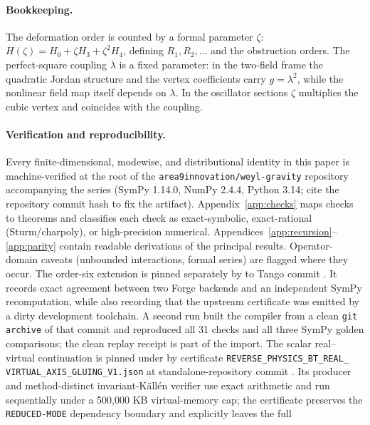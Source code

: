 \documentclass[11pt]{article}
\theoremstyle{definition}
\theoremstyle{remark}
\begin{document}
\paragraph{Bookkeeping.}
The deformation order is counted by a formal parameter $\zeta$:
$H(\zeta)=H_0+\zeta H_3+\zeta^2H_4$, defining $R_1,R_2,\dots$ and the
obstruction orders.  The perfect-square coupling $\lambda$ is a fixed
parameter: in the two-field frame the quadratic Jordan structure and
the vertex coefficients carry $g=\lambda^2$, while the nonlinear field
map itself depends on $\lambda$.  In the oscillator sections $\zeta$
multiplies the cubic vertex and coincides with the coupling.

\paragraph{Verification and reproducibility.}
Every finite-dimensional, modewise, and distributional identity in this
paper is machine-verified at the root of the
\texttt{area9innovation/weyl-gravity} repository accompanying the
series (SymPy 1.14.0, NumPy 2.4.4, Python 3.14; cite the repository
commit hash to fix the artifact).  Appendix~\ref{app:checks} maps
checks to theorems and classifies each check as exact-symbolic,
exact-rational (Sturm/charpoly), or high-precision numerical.
Appendices~\ref{app:recursion}--\ref{app:parity} contain readable
derivations of the principal results.  Operator-domain caveats
(unbounded interactions, formal series) are flagged where they occur.
The order-six extension is pinned separately by
to Tango commit
.  It records exact agreement
between two Forge backends and an independent SymPy recomputation, while also
recording that the upstream certificate was emitted by a dirty development
toolchain.  A second run built the compiler from a clean \texttt{git archive}
of that commit and reproduced all 31 checks and all three SymPy golden
comparisons; the clean replay receipt is part of the import.
The scalar real--virtual continuation is pinned under
 by certificate
\texttt{REVERSE\_PHYSICS\_BT\_REAL\_}\allowbreak
\texttt{VIRTUAL\_AXIS\_GLUING\_V1.json}
at standalone-repository commit
.  Its producer and
method-distinct invariant-K\"all\'en verifier use exact arithmetic and run
sequentially under a 500,000 KB virtual-memory cap; the certificate preserves
the \texttt{REDUCED-MODE} dependency boundary and explicitly leaves the full
\end{document}
